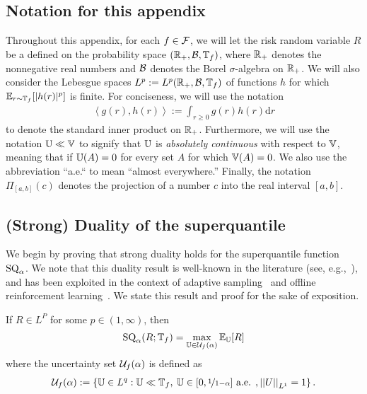 \documentclass{article}
\begin{document}
\subsection{Notation for this appendix}
Throughout this appendix, for each $f\in\mathcal{F}$, we will let the risk random variable $R$ be a defined on the probability space $(\mathbb{R}_+, \mathcal{B}, \mathbb{T}_f)$, where $\mathbb{R}_+$ denotes the nonnegative real numbers and $\mathcal{B}$ denotes the Borel $\sigma$-algebra on $\mathbb{R}_+$.  We will also consider the Lebesgue spaces $L^p := L^p(\mathbb{R}_+, \mathcal{B}, \mathbb{T}_f)$ of functions $h$ for which $\operatorname{\mathbb{E}}_{r\sim\mathbb{T}_f}[|h(r)|^p]$ is finite.  For conciseness, we will use the notation
%
\begin{align}
    \left\langle g(r), h(r)\right\rangle := \int_{r\geq 0} g(r)h(r) \text{d}r
\end{align}
%
to denote the standard inner product on $\mathbb{R}_+$.  Furthermore, we will use the notation $\mathbb{U}\ll\mathbb{V}$ to signify that $\mathbb{U}$ is \emph{absolutely continuous} with respect to $\mathbb{V}$, meaning that if $\mathbb{U}(A)=0$ for every set $A$ for which $\mathbb{V}(A)=0$.  We also use the abbreviation ``a.e.`` to mean ``almost everywhere.''  Finally, the notation $\Pi_{[a,b]}(c)$ denotes the projection of a number $c$ into the real interval $[a,b]$.

\subsection{(Strong) Duality of the superquantile}
We begin by proving that strong duality holds for the superquantile function $\operatorname{SQ}_\alpha$.  We note that this duality result is well-known in the literature (see, e.g.,~\cite{shapiro2021lectures}), and has been exploited in the context of adaptive sampling~\cite{curi2020adaptive} and offline reinforcement learning~\cite{urpi2021risk}.  We state this result and proof for the sake of exposition.
%
\begin{proposition}\label{prop:dual-rep-cvar}
If $R\in L^P$ for some $p\in(1,\infty)$, then 
%
\begin{align}
    \operatorname{SQ}_\alpha(R; \mathbb{T}_f) = \max_{\mathbb{U}\in\mathcal{U}_f(\alpha)} \operatorname{\mathbb{E}}_{\mathbb{U}}[R] \label{eq:cvar-prob}
\end{align}
%
where the uncertainty set $\mathcal{U}_f(\alpha)$ is defined as
%
\begin{align}
    \mathcal{U}_f(\alpha) := \left\{ \mathbb{U} \in L^q : \mathbb{U} \ll \mathbb{T}_f, \: \mathbb{U}\in[0, \nicefrac{1}{1-\alpha}] \text{ a.e. }, \left|\left| U \right|\right|_{L^1}=1 \right\}. \label{eq:uncertainty-set-cvar}
\end{align}
\end{proposition}
\end{document}
